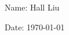 \documentclass{article}
\begin{document}
Name: Hall Liu

Date: \today 
\vspace{1.5cm}
\end{document}
